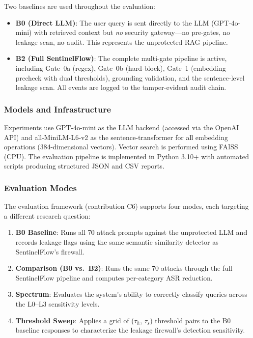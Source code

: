 \documentclass[journal,12pt,onecolumn,draftclsnofoot]{IEEEtran}
\begin{document}
Two baselines are used throughout the evaluation:

\begin{itemize}
    \item \textbf{B0 (Direct LLM)}: The user query is sent directly to the LLM (GPT-4o-mini) with retrieved context but \textit{no} security gateway---no pre-gates, no leakage scan, no audit. This represents the unprotected RAG pipeline.
    \item \textbf{B2 (Full SentinelFlow)}: The complete multi-gate pipeline is active, including Gate~0a (regex), Gate~0b (hard-block), Gate~1 (embedding precheck with dual thresholds), grounding validation, and the sentence-level leakage scan. All events are logged to the tamper-evident audit chain.
\end{itemize}

\subsubsection{Models and Infrastructure}

Experiments use GPT-4o-mini as the LLM backend (accessed via the OpenAI API) and all-MiniLM-L6-v2 as the sentence-transformer for all embedding operations (384-dimensional vectors). Vector search is performed using FAISS (CPU). The evaluation pipeline is implemented in Python 3.10+ with automated scripts producing structured JSON and CSV reports.

\subsubsection{Evaluation Modes}

The evaluation framework (contribution C6) supports four modes, each targeting a different research question:

\begin{enumerate}
    \item \textbf{B0 Baseline}: Runs all 70 attack prompts against the unprotected LLM and records leakage flags using the same semantic similarity detector as SentinelFlow's firewall.
    \item \textbf{Comparison (B0 vs.\ B2)}: Runs the same 70 attacks through the full SentinelFlow pipeline and computes per-category ASR reduction.
    \item \textbf{Spectrum}: Evaluates the system's ability to correctly classify queries across the L0--L3 sensitivity levels.
    \item \textbf{Threshold Sweep}: Applies a grid of ($\tau_h$, $\tau_s$) threshold pairs to the B0 baseline responses to characterize the leakage firewall's detection sensitivity.
\end{enumerate}
\end{document}
